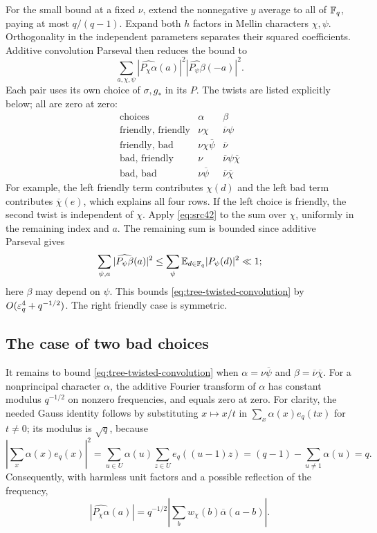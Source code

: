 For the small bound at a fixed $\nu$, extend the nonnegative $y$ average
to all of $\mathbb F_q$, paying at most $q/(q-1)$.  Expand both $h$ factors
in Mellin characters $\chi,\psi$.  Orthogonality in the independent
parameters separates their squared coefficients.  Additive convolution
Parseval then reduces the bound to
\begin{equation}\label{eq:tree-twisted-convolution}
 \sum_{a,\chi,\psi}
        |\widehat{P_\chi\alpha}(a)|^2
        |\widehat{P_\psi\beta}(-a)|^2.
\end{equation}
Each pair uses its own choice of $\sigma,g_*$ in its $P$.  The twists
are listed explicitly below; all are zero at zero:
\[
\begin{array}{c|cc}
 \text{choices}&\alpha&\beta\\ \hline
 \text{friendly, friendly}&\nu\chi&\overline\nu\psi\\
 \text{friendly, bad}&\nu\chi\overline\psi&\overline\nu\\
 \text{bad, friendly}&\nu&\overline\nu\psi\overline\chi\\
 \text{bad, bad}&\nu\overline\psi&\overline\nu\overline\chi
\end{array}
\]
For example, the left friendly term contributes $\chi(d)$ and the
left bad term contributes $\overline\chi(e)$, which explains all four
rows.  If the left choice is friendly, the second twist is independent
of $\chi$.  Apply \eqref{eq:src42} to the sum over $\chi$, uniformly
in the remaining index and $a$.  The remaining sum is bounded since
additive Parseval gives
\[
 \sum_{\psi,a}|\widehat{P_\psi\beta}(a)|^2
 \leq\sum_\psi\mathbb E_{d\in\mathbb F_q}|P_\psi(d)|^2\ll1;
\]
here $\beta$ may depend on $\psi$.  This bounds
\eqref{eq:tree-twisted-convolution} by
$O(\varepsilon_q^4+q^{-1/2})$.  The right friendly case is symmetric.

\subsection{The case of two bad choices}

It remains to bound \eqref{eq:tree-twisted-convolution} when
$\alpha=\nu\overline\psi$ and
$\beta=\overline\nu\overline\chi$.  For a nonprincipal character
$\alpha$, the additive Fourier transform of $\alpha$ has constant
modulus $q^{-1/2}$ on nonzero frequencies, and equals zero at zero.
For clarity, the needed Gauss identity follows by substituting
$x\mapsto x/t$ in $\sum_x\alpha(x)e_q(tx)$ for $t\ne0$; its
modulus is $\sqrt q$, because
\[
 \left|\sum_x\alpha(x)e_q(x)\right|^2
 =\sum_{u\in U}\alpha(u)\sum_{z\in U}e_q((u-1)z)
 =(q-1)-\sum_{u\ne1}\alpha(u)=q.
\]
Consequently, with harmless unit factors and a possible reflection
of the frequency,
\begin{equation}\label{eq:tree-Gauss-convolution}
 |\widehat{P_\chi\alpha}(a)|
   =q^{-1/2}\left|\sum_b w_\chi(b)\overline\alpha(a-b)\right|.
\end{equation}


